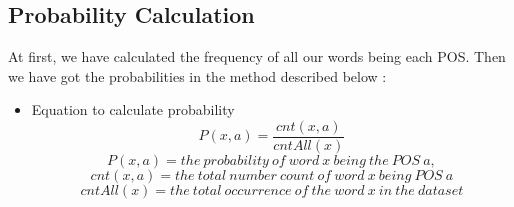 \documentclass{standalone}
\begin{document}
\subsection{Probability Calculation}
At first, we have calculated the frequency of all our words being each POS. Then we  have got the probabilities in the method described below :
\begin{itemize}
    \item Equation to calculate probability
    \begin{equation}\label{eq1}
    P(x,a) = \frac{cnt(x,a)}{cntAll(x)}
    \end{equation}
 \begin{displaymath} P(x, a) = the\:probability\:of \:word\:x\:being\:the\:POS\:a,\end{displaymath}
  \begin{displaymath}
   cnt(x, a) = the\:total\:number\:count\:of\:word\:x\:being\:POS\:a
  \end{displaymath}
   \begin{displaymath}
   cntAll(x) = the\:total\:occurrence\:of\:the\:word\:x\:in\:the\:dataset
  \end{displaymath}
  \end{itemize}
\end{document}
